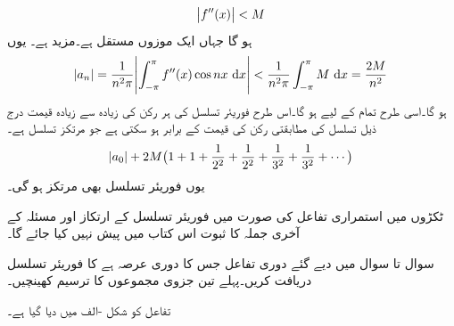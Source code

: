 \begin{align*}
\abs{f''(x)} <M
\end{align*}
ہو گا جہاں  ایک موزوں مستقل ہے۔مزید  ہے۔ یوں
\begin{align*}
\abs{a_n}=\frac{1}{n^2\pi}\abs{\int_{-\pi}^{\pi} f''(x) \cos nx \, \dif x}<\frac{1}{n^2\pi} \int_{-\pi}^{\pi} M \,\dif x=\frac{2M}{n^2}
\end{align*}
ہو گا۔اسی طرح تمام  کے لیے  ہو گا۔اس طرح فوریئر تسلسل کی ہر رکن کی زیادہ سے زیادہ قیمت درج ذیل تسلسل کی مطابقتی رکن کی قیمت کے برابر ہو سکتی ہے جو مرتکز تسلسل ہے۔
\begin{align*}
\abs{a_0}+2M\big(1+1+\frac{1}{2^2}+\frac{1}{2^2}+\frac{1}{3^2}+\frac{1}{3^2}+\cdots\big)
\end{align*}
یوں فوریئر تسلسل بھی مرتکز ہو گی۔

ٹکڑوں میں استمراری تفاعل  کی صورت میں فوریئر تسلسل کے  ارتکاز اور مسئلہ  کے آخری جملہ  کا ثبوت اس کتاب میں پیش نہیں کیا جائے گا۔ 

سوال  تا سوال  میں دیے گئے دوری تفاعل  جس کا دوری عرصہ  ہے  کا فوریئر تسلسل دریافت کریں۔پہلے تین جزوی مجموعوں کا ترسیم کھینچیں۔

\quad تفاعل کو شکل -الف میں دیا گیا ہے۔

